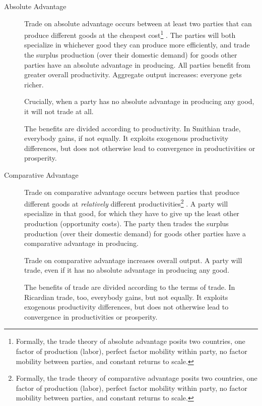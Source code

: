 \begin{description}
	\item[Absolute Advantage] \label{it:absoluteadvantage}Trade on absolute advantage occurs between at least two parties that can produce different goods at the cheapest cost\footnote{
		Formally, the trade theory of absolute advantage posits two countries, one factor of production (labor), perfect factor mobility within party, no factor mobility between parties, and constant returns to scale.} \citep{Smith-1776-lq}. The parties will both specialize in whichever good they can produce more efficiently, and trade the surplus production (over their domestic demand) for goods other parties have an absolute advantage in producing. All parties benefit from greater overall productivity. Aggregate output increases: everyone gets richer. 

	Crucially, when a party has no absolute advantage in producing any good, it will not trade at all. 

	The benefits are divided according to productivity. %
	In Smithian trade, everybody gains, if not equally. It exploits exogenous productivity differences, but does not otherwise lead to convergence in productivities or prosperity.

	\item[Comparative Advantage]\label{it:comparativeadvantage} Trade on comparative advantage occurs between parties that produce different goods at \emph{relatively} different productivities\footnote{
		Formally, the trade theory of comparative advantage posits two countries, one factor of production (labor), perfect factor mobility within party, no factor mobility between parties, and constant returns to scale.} 
	\citep{Ricardo1817}. A party will specialize in that good, for which they have to give up the least other production (opportunity costs). The party then trades the surplus production (over their domestic demand) for goods other parties have a comparative advantage in producing. 
	
	Trade on comparative advantage increases overall output. 
	A party will trade, even if it has no absolute advantage in producing any good.

	The benefits of trade are divided according to the terms of trade. %
	In Ricardian trade, too, everybody gains, but not equally. It exploits exogenous productivity differences, but does not otherwise lead to convergence in productivities or prosperity.


\end{description}
